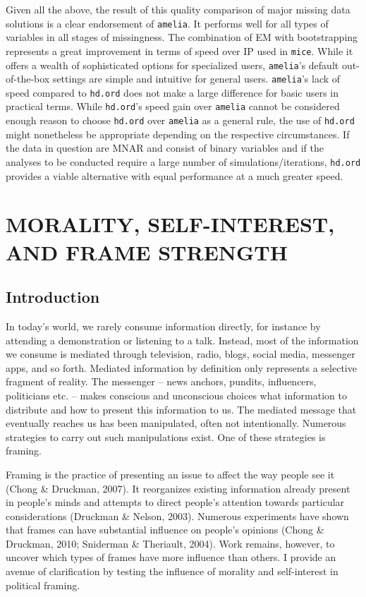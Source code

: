 \documentclass[12pt,econ]{sources/authesis}
\begin{document}
Given all the above, the result of this quality comparison of major missing data solutions is a clear endorsement of \texttt{amelia}. It performs well for all types of variables in all stages of missingness. The combination of EM with bootstrapping represents a great improvement in terms of speed over IP used in \texttt{mice}. While it offers a wealth of sophisticated options for specialized users, \texttt{amelia}'s default out-of-the-box settings are simple and intuitive for general users. \texttt{amelia}'s lack of speed compared to \texttt{hd.ord} does not make a large difference for basic users in practical terms. While \texttt{hd.ord}'s speed gain over \texttt{amelia} cannot be considered enough reason to choose \texttt{hd.ord} over \texttt{amelia} as a general rule, the use of \texttt{hd.ord} might nonetheless be appropriate depending on the respective circumstances. If the data in question are MNAR and consist of binary variables and if the analyses to be conducted require a large number of simulations/iterations, \texttt{hd.ord} provides a viable alternative with equal performance at a much greater speed.

\hypertarget{framing}{%
\chapter{MORALITY, SELF-INTEREST, AND FRAME STRENGTH}\label{framing}}

\hypertarget{framing-intro}{%
\section{Introduction}\label{framing-intro}}

In today's world, we rarely consume information directly, for instance by attending a demonstration or listening to a talk. Instead, most of the information we consume is mediated through television, radio, blogs, social media, messenger apps, and so forth. Mediated information by definition only represents a selective fragment of reality. The messenger -- news anchors, pundits, influencers, politicians etc. -- makes conscious and unconscious choices what information to distribute and how to present this information to us. The mediated message that eventually reaches us has been manipulated, often not intentionally. Numerous strategies to carry out such manipulations exist. One of these strategies is framing.

Framing is the practice of presenting an issue to affect the way people see it (Chong \& Druckman, 2007). It reorganizes existing information already present in people's minds and attempts to direct people's attention towards particular considerations (Druckman \& Nelson, 2003). Numerous experiments have shown that frames can have substantial influence on people's opinions (Chong \& Druckman, 2010; Sniderman \& Theriault, 2004). Work remains, however, to uncover which types of frames have more influence than others. I provide an avenue of clarification by testing the influence of morality and self-interest in political framing.
\end{document}
